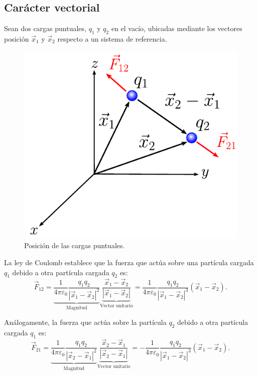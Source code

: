 \subsection*{Carácter vectorial}

Sean dos cargas puntuales, $q_1$ y $q_2$ en el vacío,  ubicadas mediante los
vectores posición $\vec{x}_1$ y $\vec{x}_2$ respecto a un sistema de referencia.

\begin{figure}[H]
    \centering
    \includegraphics[scale = 0.7]{Figuras/Coulomb-Vectorial.pdf}
    \caption{Posición de las cargas puntuales.}
    \label{fig:Coulomb-Vectorial}
\end{figure}

 La ley de Coulomb establece que la fuerza que actúa sobre una partícula cargada $q_1$ debido a otra partícula cargada $q_2$ es:
 \begin{equation*}
 \vec{F}_{12} = \underbrace{\frac{1}{4\pi \varepsilon_0} \frac{q_1 q_2}{|\vec{x}_1 - \vec{x}_2|^2}}_{\text{Magnitud}} \underbrace{\frac{\vec{x}_1 - \vec{x}_2}{|\vec{x}_1 - \vec{x}_2|}}_{\text{Vector unitario}} = \frac{1}{4\pi \varepsilon_0} \frac{q_1 q_2}{|\vec{x}_1 - \vec{x}_2|^3} (\vec{x}_1 - \vec{x}_2).
 \end{equation*}

Análogamente, la fuerza que actúa sobre la partícula $q_2$ debido a otra
partícula cargada $q_1$ es:
\begin{equation*}
 \vec{F}_{21} = \underbrace{\frac{1}{4\pi \varepsilon_0} \frac{q_1 q_2}{|\vec{x}_2 - \vec{x}_1|^2}}_{\text{Magnitud}} \underbrace{\frac{\vec{x}_2 - \vec{x}_1}{|\vec{x}_2 - \vec{x}_1|}}_{\text{Vector unitario}} = - \frac{1}{4\pi \varepsilon_0} \frac{q_1 q_2}{|\vec{x}_1 - \vec{x}_2|^3} (\vec{x}_1 - \vec{x}_2).
 \end{equation*}

